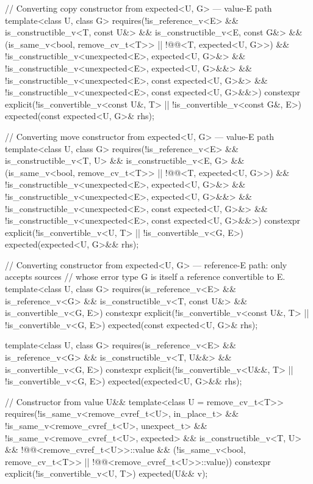 \begin{codeblock}
{{    // Converting copy constructor from expected<U, G> — value-E path
    template<class U, class G>
      requires(!is_reference_v<E> && is_constructible_v<T, const U&> &&
               is_constructible_v<E, const G&> &&
               (is_same_v<bool, remove_cv_t<T>> ||
                !@@<T, expected<U, G>>) &&
               !is_constructible_v<unexpected<E>, expected<U, G>&> &&
               !is_constructible_v<unexpected<E>, expected<U, G>&&> &&
               !is_constructible_v<unexpected<E>, const expected<U, G>&> &&
               !is_constructible_v<unexpected<E>, const expected<U, G>&&>)
    constexpr explicit(!is_convertible_v<const U&, T> || !is_convertible_v<const G&, E>)
        expected(const expected<U, G>& rhs);

    // Converting move constructor from expected<U, G> — value-E path
    template<class U, class G>
      requires(!is_reference_v<E> && is_constructible_v<T, U> &&
               is_constructible_v<E, G> &&
               (is_same_v<bool, remove_cv_t<T>> ||
                !@@<T, expected<U, G>>) &&
               !is_constructible_v<unexpected<E>, expected<U, G>&> &&
               !is_constructible_v<unexpected<E>, expected<U, G>&&> &&
               !is_constructible_v<unexpected<E>, const expected<U, G>&> &&
               !is_constructible_v<unexpected<E>, const expected<U, G>&&>)
    constexpr explicit(!is_convertible_v<U, T> || !is_convertible_v<G, E>)
        expected(expected<U, G>&& rhs);

    // Converting constructor from expected<U, G> — reference-E path: only accepts sources
    // whose error type G is itself a reference convertible to E.
    template<class U, class G>
      requires(is_reference_v<E> && is_reference_v<G> &&
               is_constructible_v<T, const U&> && is_convertible_v<G, E>)
    constexpr explicit(!is_convertible_v<const U&, T> || !is_convertible_v<G, E>)
        expected(const expected<U, G>& rhs);

    template<class U, class G>
      requires(is_reference_v<E> && is_reference_v<G> && is_constructible_v<T, U&&> &&
               is_convertible_v<G, E>)
    constexpr explicit(!is_convertible_v<U&&, T> || !is_convertible_v<G, E>)
        expected(expected<U, G>&& rhs);

    // Constructor from value U&&
    template<class U = remove_cv_t<T>>
      requires(!is_same_v<remove_cvref_t<U>, in_place_t> &&
               !is_same_v<remove_cvref_t<U>, unexpect_t> &&
               !is_same_v<remove_cvref_t<U>, expected> && is_constructible_v<T, U> &&
               !@@<remove_cvref_t<U>>::value &&
               (!is_same_v<bool, remove_cv_t<T>> ||
                !@@<remove_cvref_t<U>>::value))
    constexpr explicit(!is_convertible_v<U, T>) expected(U&& v);

}}
\end{codeblock}
